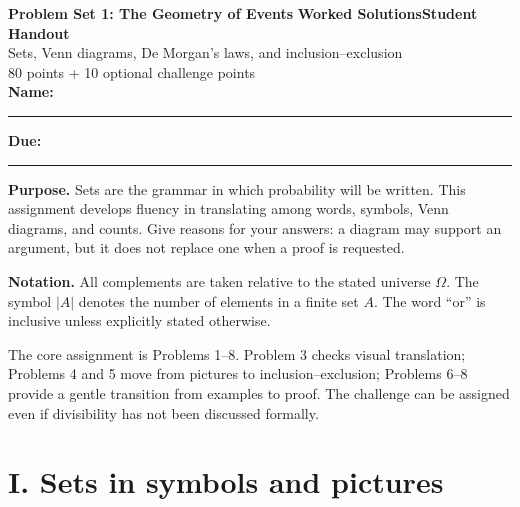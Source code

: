 \documentclass[11pt]{article}
\newcommand{\edition}{\ifsolutions Worked Solutions\else Student Handout\fi}
\begin{document}
\begin{tcolorbox}[
  enhanced,colback=paper,colframe=navy,boxrule=1.1pt,arc=2mm,
  left=5mm,right=5mm,top=3.5mm,bottom=3.5mm,
  borderline west={5pt}{0pt}{mint}]
  {\Large\bfseries\color{navy}Problem Set 1: The Geometry of Events}
  \hfill{\bfseries\color{mint}\edition}\\[3pt]
  {\large Sets, Venn diagrams, De Morgan's laws, and inclusion--exclusion}\\[4pt]
  {\small\color{muted}80 points + 10 optional challenge points}
  \ifsolutions\else
    \\[7pt]\textbf{Name:}\ \rule{0.46\linewidth}{0.4pt}\hfill
    \textbf{Due:}\ \rule{0.21\linewidth}{0.4pt}
  \fi
\end{tcolorbox}

\begin{overviewbox}
\textbf{Purpose.} Sets are the grammar in which probability will be written.
This assignment develops fluency in translating among words, symbols, Venn
diagrams, and counts. Give reasons for your answers: a diagram may support an
argument, but it does not replace one when a proof is requested.

\textbf{Notation.} All complements are taken relative to the stated universe
$\Omega$. The symbol $|A|$ denotes the number of elements in a finite set $A$.
The word ``or'' is inclusive unless explicitly stated otherwise.
\end{overviewbox}

\ifsolutions
\begin{instructornote}
The core assignment is Problems 1--8. Problem 3 checks visual translation;
Problems 4 and 5 move from pictures to inclusion--exclusion; Problems 6--8
provide a gentle transition from examples to proof. The challenge can be
assigned even if divisibility has not been discussed formally.
\end{instructornote}
\fi

\section*{I. Sets in symbols and pictures}
\end{document}
